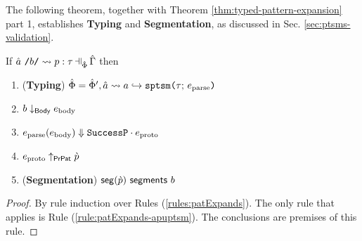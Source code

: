 \begin{grayparbox}
The following theorem, together with Theorem \ref{thm:typed-pattern-expansion} part 1, establishes \textbf{Typing} and \textbf{Segmentation}, as discussed in Sec. \ref{sec:ptsms-validation}.

\begin{theorem}
\label{thm:spTSM-Typing-Segmentation-B}
If $\patExpands{\upctx}{\uPhi}{\utsmap{\tsmv}{b}}{p}{\tau}$ then 
\begin{enumerate}
        \item (\textbf{Typing}) $\hat\Phi=\hat\Phi', \hat{a} \leadsto a \hookrightarrow \texttt{sptsm}\texttt{(}\tau;\,e_\text{parse}\texttt{)}$
        \item $b \downarrow_\mathsf{Body} e_\text{body}$
        \item $e_\text{parse}(e_\text{body}) \Downarrow {\mathtt{SuccessP}}\cdot{e_\text{proto}}$
        \item $e_\text{proto} \uparrow_\mathsf{PrPat} \grave{p}$
        \item (\textbf{Segmentation}) $\mathsf{seg}(\grave{p})~\mathsf{segments}~b$
\end{enumerate}
\end{theorem}
\begin{proof} By rule induction over Rules (\ref{rules:patExpands}). The only rule that applies is Rule (\ref{rule:patExpands-apuptsm}). The conclusions are premises of this rule.
\end{proof}
\end{grayparbox}


